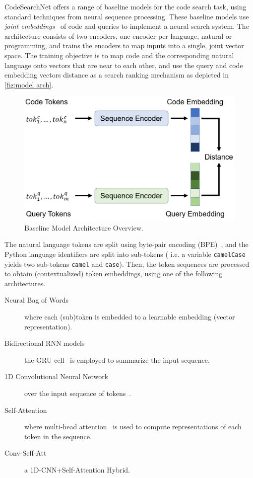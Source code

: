 \documentclass{article}
\begin{document}
CodeSearchNet offers a range of baseline models for the code search task, using standard techniques from neural sequence processing. These baseline models use
\emph{joint embeddings}~\cite{gu2018deep,mitra2018introduction} of code and queries to implement a neural search
system. The architecture consists of two encoders, one encoder per language, natural or programming, and trains the encoders to map inputs into a single, joint vector
space.
The training objective is to map code and the corresponding natural language onto vectors that are near to each other, and use the query and code embedding vectors distance as a search ranking mechanism\cite{1909.09436} as depicted in \autoref{fig:model arch}.

\begin{figure}[t]
    \includegraphics[width=\columnwidth]{ModelArchOverview.png}
    \caption{\label{fig:model arch}Baseline Model Architecture Overview\cite{1909.09436}.}
\end{figure}

The natural language tokens are split using byte-pair encoding (BPE)~\cite{gage1994new,sennrich2016neural}, and the Python language identifiers are split into sub-tokens ( i.e. a variable \texttt{camelCase} yields two sub-tokens \texttt{camel} and \texttt{case}). Then, the token sequences are processed to obtain (contextualized) token embeddings, using one of the following architectures.
\begin{description}
    \item[Neural Bag of Words] where each (sub)token is
      embedded to a learnable embedding (vector
      representation).
    \item[Bidirectional RNN models] the GRU cell~\cite{cho2014properties} is employed to summarize the input sequence.
    \item[1D Convolutional Neural Network] over the
      input sequence of tokens~\cite{kim2014convolutional}.
    \item[Self-Attention] where multi-head attention~\cite{vaswani2017attention}
      is used to compute representations of each token
      in the sequence.
    \item[Conv-Self-Att] a 1D-CNN+Self-Attention Hybrid.
\end{description}
\end{document}
